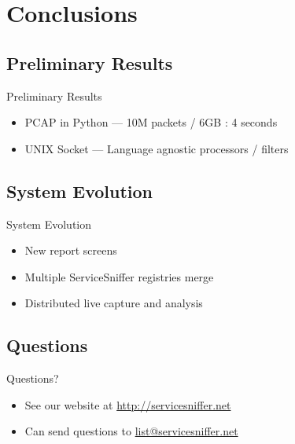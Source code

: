 \documentclass{beamer}
\begin{document}

\section{Conclusions}
\subsection{Preliminary Results}
\begin{frame}{Preliminary Results}
    \begin{itemize}
        \item PCAP in Python --- 10M packets / 6GB : 4 seconds
        \item UNIX Socket --- Language agnostic processors / filters
    \end{itemize}
\end{frame}


\subsection{System Evolution}
\begin{frame}{System Evolution}
    \begin{itemize}
        \item New report screens
        \item Multiple ServiceSniffer registries merge
        \item Distributed live capture and analysis
    \end{itemize}
\end{frame}


\subsection{Questions}
\begin{frame}{Questions?}
    \begin{itemize}
        \item See our website at \url{http://servicesniffer.net}
        \item Can send questions to \url{list@servicesniffer.net}
    \end{itemize}
\end{frame}
\end{document}

